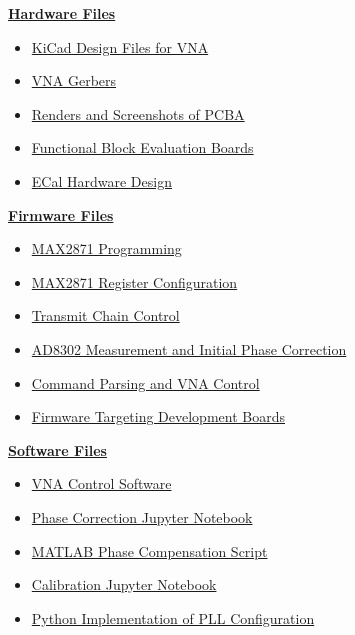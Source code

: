 \textbf{\href{https://github.com/joshajohnson/vna/tree/master/Hardware}{Hardware Files}}
\begin{itemize}
	\item \href{https://github.com/joshajohnson/vna/tree/master/Hardware/VNAv0}{KiCad Design Files for VNA}
	\item \href{https://github.com/joshajohnson/vna/tree/master/Hardware/VNAv0/gerbers}{VNA Gerbers}
	\item \href{https://github.com/joshajohnson/vna/tree/master/Hardware/VNAv0/renders_screenshots}{Renders and Screenshots of PCBA}
	\item \href{https://github.com/joshajohnson/vna/tree/master/Hardware/Test\%20Boards}{Functional Block Evaluation Boards}
	\item \href{https://github.com/joshajohnson/vna/tree/master/Hardware/Ecal}{ECal Hardware Design}
\end{itemize}
\textbf{\href{https://github.com/joshajohnson/vna/tree/master/Firmware/VNA}{Firmware Files} }
\begin{itemize}
	\item \href{https://github.com/joshajohnson/vna/blob/master/Firmware/VNA/Src/max2871.c}{MAX2871 Programming}
	\item
	\href{https://github.com/joshajohnson/vna/blob/master/Firmware/VNA/Src/max2871_registers.c}{MAX2871 Register Configuration}
	\item
	\href{https://github.com/joshajohnson/vna/blob/master/Firmware/VNA/Src/txChain.c}{Transmit Chain Control}
	\item
	\href{https://github.com/joshajohnson/vna/blob/master/Firmware/VNA/Src/receiver.c}{AD8302 Measurement and Initial Phase Correction}
	\item
	\href{https://github.com/joshajohnson/vna/blob/master/Firmware/VNA/Src/commandParser.c}{Command Parsing and VNA Control}
	\item \href{https://github.com/joshajohnson/vna/tree/master/Firmware/DevBoards}{Firmware Targeting Development Boards}
\end{itemize}
\textbf{\href{https://github.com/joshajohnson/vna/tree/master/Software/vna}{Software Files}}
\begin{itemize}
	\item \href{https://github.com/joshajohnson/vna/blob/master/Software/vna/vna.py}{VNA Control Software}
	\item \href{https://github.com/joshajohnson/vna/blob/master/Software/vna/phase_correction.ipynb}{Phase Correction Jupyter Notebook}
	\item \href{https://github.com/joshajohnson/vna/blob/master/Software/justTesting/ad8302Cal.m}{MATLAB Phase Compensation Script}
	\item \href{https://github.com/joshajohnson/vna/blob/master/Software/vna/calibration.ipynb}{Calibration Jupyter Notebook}
	\item \href{https://github.com/joshajohnson/vna/blob/master/Firmware/DevBoards/freqGen.py}{Python Implementation of PLL Configuration}
\end{itemize}



